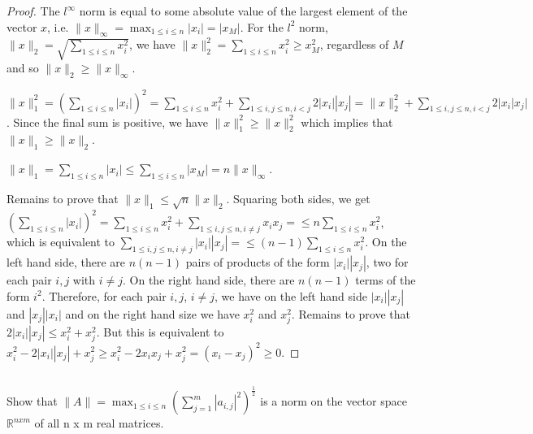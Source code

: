 \begin{proof}
The $l^\infty$ norm is equal to some absolute value of the largest element of the vector $x$, i.e. $\|x\|_\infty = \max_{1 \leq i \leq n} |x_i| = |x_M|$.
For the $l^2$ norm, $\|x\|_2 = \sqrt{\sum_{1 \leq i \leq n} x_i^2}$, we have $\|x\|_2^2 = \sum_{1 \leq i \leq n} x_i^2 \geq x_M^2$, regardless of $M$ and so $\|x\|_2 \geq \|x\|_\infty$. 

$\|x\|_1^2 = ( \sum_{1 \leq i \leq n} |x_i|)^2 = \sum_{1 \leq i \leq n} x_i^2 + \sum_{1 \leq i,j \leq n, i< j} 2|x_i||x_j| = \|x\|_2^2 + \sum_{1 \leq i,j \leq n, i< j} 2|x_i|x_j|$. Since the final sum is positive, we have $\|x\|_1^2 \geq \|x\|_2^2$ which implies that $\|x\|_1 \geq \|x\|_2$.

$\|x\|_1 = \sum_{1 \leq i \leq n} |x_i| \leq \sum_{1 \leq i \leq n} |x_M| = n\|x\|_\infty$.

Remains to prove that $\|x\|_1 \leq \sqrt{n}\|x\|_2$. Squaring  both sides, we get $( \sum_{1 \leq i \leq n} |x_i|)^2 = \sum_{1 \leq i \leq n} x_i^2 + \sum_{1 \leq i,j \leq n,i\neq j} x_ix_j= \leq n\sum_{1 \leq i \leq n} x_i^2$, which is equivalent to $\sum_{1 \leq i,j \leq n,i\neq j} |x_i||x_j|= \leq (n-1)\sum_{1 \leq i \leq n} x_i^2$. On the left hand side, there are $n(n-1)$ pairs of products of the form $|x_i||x_j|$, two for each pair $i,j$ with $i\neq j$. On the right hand side, there are $n(n-1)$ terms of the form $i^2$. Therefore, for each pair $i,j$, $i\neq j$, we have on the left hand side $|x_i||x_j|$ and $|x_j||x_i|$ and on the right hand size we have $x_i^2$ and $x_j^2$. Remains to prove that $2|x_i||x_j| \leq x_i^2 + x_j^2$. But this is equivalent to $x_i^2 - 2|x_i||x_j| + x_j^2 \geq x_i^2 - 2x_ix_j + x_j^2 = (x_i - x_j)^2 \geq 0$.

\end{proof}



\subsection{} Show that $\| A \| = \max_{1 \leq i \leq n} ( \sum_{j=1}^m |a_{i,j}|^2 ) ^ {\frac{1}{2}}$ is a norm on the vector space $\mathbb{R}^{nxm}$ of all n x m real matrices.

